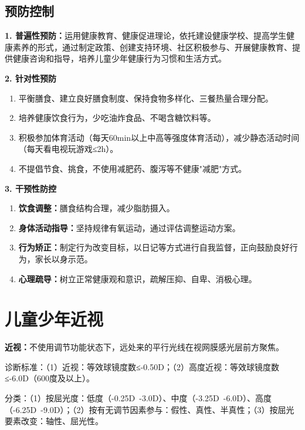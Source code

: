 \subsection{预防控制}

\begin{keybox}
\textbf{1. 普遍性预防：}运用健康教育、健康促进理论，依托建设健康学校、提高学生健康素养的形式，通过制定政策、创建支持环境、社区积极参与、开展健康教育、提供健康咨询和指导，培养儿童少年健康行为习惯和生活方式。

\textbf{2. 针对性预防}
\begin{enumerate}[leftmargin=*]
    \item 平衡膳食、建立良好膳食制度、保持食物多样化、三餐热量合理分配。
    \item 培养健康饮食行为，少吃油炸食品、不喝含糖饮料等。
    \item 积极参加体育活动（每天60min以上中高等强度体育活动），减少静态活动时间（每天看电视玩游戏≤2h）。
    \item 不提倡节食、挑食，不使用减肥药、腹泻等不健康"减肥"方式。
\end{enumerate}

\textbf{3. 干预性防控}
\begin{enumerate}[leftmargin=*]
    \item \textbf{饮食调整：}膳食结构合理，减少脂肪摄入。
    \item \textbf{身体活动指导：}坚持规律有氧运动，通过评估调整运动方案。
    \item \textbf{行为矫正：}制定行为改变目标，以日记等方式进行自我监督，正向鼓励良好行为，家长以身示范。
    \item \textbf{心理疏导：}树立正常健康观和意识，疏解压抑、自卑、消极心理。
\end{enumerate}
\end{keybox}

\section{儿童少年近视}\difficulty

\begin{defbox}
\textbf{近视：}不使用调节功能状态下，远处来的平行光线在视网膜感光层前方聚焦。

诊断标准：（1）近视：等效球镜度数≤-0.50D；（2）高度近视：等效球镜度数≤-6.0D（600度及以上）。

分类：（1）按屈光度：低度（-0.25D~-3.0D）、中度（-3.25D~-6.0D）、高度（-6.25D~-9.0D）；（2）按有无调节因素参与：假性、真性、半真性；（3）按屈光要素改变：轴性、屈光性。
\end{defbox}

